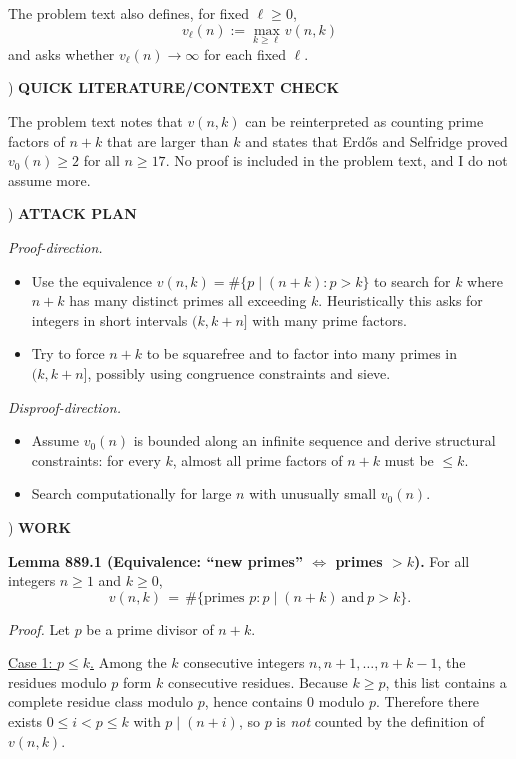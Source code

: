 \noindent The problem text also defines, for fixed $\ell\ge 0$,
\[
 v_\ell(n) := \max_{k\ge \ell} v(n,k)
\]
and asks whether $v_\ell(n)\to\infty$ for each fixed $\ell$.

) \textbf{QUICK LITERATURE/CONTEXT CHECK}

\noindent The problem text notes that $v(n,k)$ can be reinterpreted as counting prime factors of $n+k$ that are larger than $k$ and states that Erd\H{o}s and Selfridge proved $v_0(n)\ge 2$ for all $n\ge 17$. No proof is included in the problem text, and I do not assume more.

) \textbf{ATTACK PLAN}

\noindent 
\emph{Proof-direction.}
\begin{itemize}
\item Use the equivalence $v(n,k)=\#\{p\mid(n+k): p>k\}$ to search for $k$ where $n+k$ has many distinct primes all exceeding $k$. Heuristically this asks for integers in short intervals $(k,k+n]$ with many prime factors.
\item Try to force $n+k$ to be squarefree and to factor into many primes in $(k,k+n]$, possibly using congruence constraints and sieve.
\end{itemize}

\noindent \emph{Disproof-direction.}
\begin{itemize}
\item Assume $v_0(n)$ is bounded along an infinite sequence and derive structural constraints: for every $k$, almost all prime factors of $n+k$ must be $\le k$.
\item Search computationally for large $n$ with unusually small $v_0(n)$.
\end{itemize}

) \textbf{WORK}

\noindent \textbf{Lemma 889.1 (Equivalence: ``new primes'' $\Leftrightarrow$ primes $>k$).}
For all integers $n\ge 1$ and $k\ge 0$,
\[
 v(n,k) \,=\, \#\{\text{primes }p: p\mid(n+k)\ \text{and}\ p>k\}.
\]

\noindent \emph{Proof.}
Let $p$ be a prime divisor of $n+k$.

\noindent \underline{Case 1: $p\le k$.}
Among the $k$ consecutive integers $n,n+1,\dots,n+k-1$, the residues modulo $p$ form $k$ consecutive residues.
Because $k\ge p$, this list contains a complete residue class modulo $p$, hence contains $0$ modulo $p$.
Therefore there exists $0\le i<p\le k$ with $p\mid(n+i)$, so $p$ is \emph{not} counted by the definition of $v(n,k)$.

